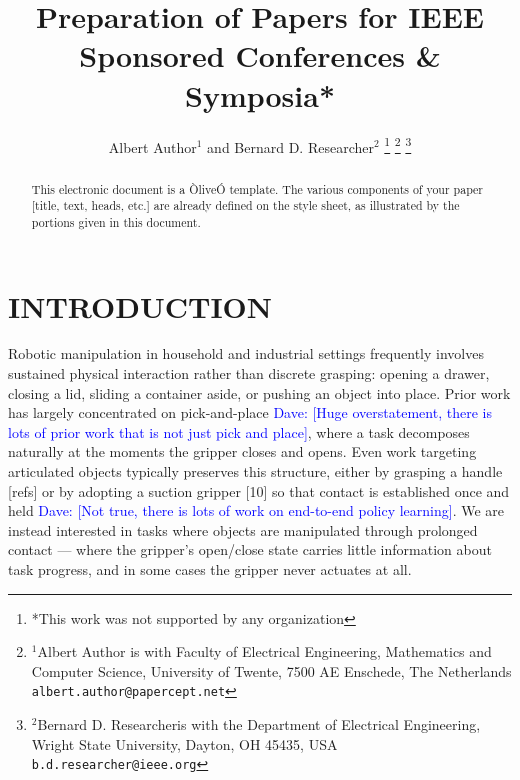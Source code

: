 \documentclass[letterpaper, 10 pt, conference]{ieeeconf}  %
\title{\LARGE \bf
Preparation of Papers for IEEE Sponsored Conferences \& Symposia*
}
\author{Albert Author$^{1}$ and Bernard D. Researcher$^{2}$%
\thanks{*This work was not supported by any organization}%
\thanks{$^{1}$Albert Author is with Faculty of Electrical Engineering, Mathematics and Computer Science,
        University of Twente, 7500 AE Enschede, The Netherlands
        {\tt\small albert.author@papercept.net}}%
\thanks{$^{2}$Bernard D. Researcheris with the Department of Electrical Engineering, Wright State University,
        Dayton, OH 45435, USA
        {\tt\small b.d.researcher@ieee.org}}%
}
\newcommand{\dave}[1]{\textcolor{blue}{Dave: [#1]}} %
\begin{document}
\maketitle
\thispagestyle{empty}
\pagestyle{empty}


\begin{abstract}

This electronic document is a ÒliveÓ template. The various components of your paper [title, text, heads, etc.] are already defined on the style sheet, as illustrated by the portions given in this document.

\end{abstract}


\section{INTRODUCTION}

Robotic manipulation in household and industrial settings frequently involves sustained physical interaction rather than discrete grasping: opening a drawer, closing a lid, sliding a container aside, or pushing an object into place. Prior work has largely concentrated on pick-and-place \dave{Huge overstatement, there is lots of prior work that is not just pick and place}, where a task decomposes naturally at the moments the gripper closes and opens. Even work targeting articulated objects typically preserves this structure, either by grasping a handle [refs] or by adopting a suction gripper [10] so that contact is established once and held \dave{Not true, there is lots of work on end-to-end policy learning}. We are instead interested in tasks where objects are manipulated through prolonged contact — where the gripper's open/close state carries little information about task progress, and in some cases the gripper never actuates at all. 
\end{document}
